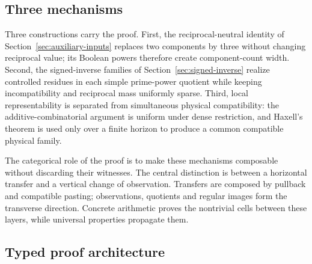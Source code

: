 \subsection*{Three mechanisms}

Three constructions carry the proof.  First, the reciprocal-neutral identity of Section~\ref{sec:auxiliary-inputs} replaces two components by three without changing reciprocal value; its Boolean powers therefore create component-count width.  Second, the signed-inverse families of Section~\ref{sec:signed-inverse} realize controlled residues in each simple prime-power quotient while keeping incompatibility and reciprocal mass uniformly sparse.  Third, local representability is separated from simultaneous physical compatibility: the additive-combinatorial argument is uniform under dense restriction, and Haxell's theorem is used only over a finite horizon to produce a common compatible physical family.

The categorical role of the proof is to make these mechanisms composable without discarding their witnesses.  The central distinction is between a horizontal transfer and a vertical change of observation.  Transfers are composed by pullback and compatible pasting; observations, quotients and regular images form the transverse direction.  Concrete arithmetic proves the nontrivial cells between these layers, while universal properties propagate them.

\subsection*{Typed proof architecture}

